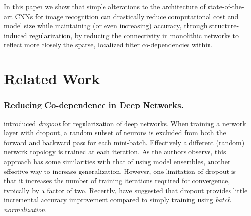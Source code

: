 \documentclass[thesis]{subfiles}
\begin{document}
	
	In this paper we show that simple alterations to the architecture of state-of-the-art CNNs for image recognition can drastically reduce computational cost and model size while maintaining (or even increasing) accuracy, through structure-induced regularization, by reducing the connectivity in monolithic networks to reflect more closely the sparse, localized filter co-dependencies within.
	
	\section{Related Work}
	\label{previouswork}
	
	
	\subsubsection{Reducing Co-dependence in Deep Networks.}
	\label{regularization}
	\citet{1207.0580v1} introduced {\em dropout} for regularization of deep networks. When training a network layer with dropout, a random subset of neurons is excluded from both the forward and backward pass for each mini-batch. Effectively a different (random) network topology is trained at each iteration. As the authors observe, this approach has some similarities with that of using model ensembles, another effective way to increase generalization. However, one limitation of dropout is that it increases the number of training iterations required for convergence, typically by a factor of two. Recently, \citet{Szegedy2014going} have suggested that dropout provides little incremental accuracy improvement compared to simply training using {\em batch normalization}. 
	
\end{document}
